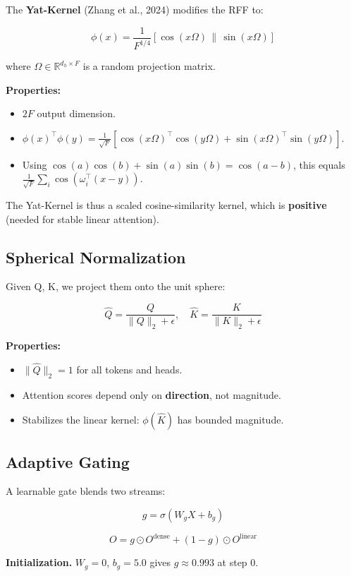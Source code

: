 The \textbf{Yat-Kernel} (Zhang et al., 2024) modifies the RFF to:

\[
\phi(x) = \frac{1}{F^{1/4}} [\cos(x \Omega) \,\|\, \sin(x \Omega)]
\]

where $\Omega \in \mathbb{R}^{d_h \times F}$ is a random projection matrix.

\textbf{Properties:}

\begin{itemize}
\item $2F$ output dimension.
\item $\phi(x)^\top \phi(y) = \frac{1}{\sqrt{F}} [\cos(x\Omega)^\top \cos(y\Omega) + \sin(x\Omega)^\top \sin(y\Omega)]$.
\item Using $\cos(a)\cos(b) + \sin(a)\sin(b) = \cos(a - b)$, this equals
  $\frac{1}{\sqrt{F}} \sum_i \cos(\omega_i^\top (x - y))$.

\end{itemize}
The Yat-Kernel is thus a scaled cosine-similarity kernel, which is 
\textbf{positive} (needed for stable linear attention).

\subsection{Spherical Normalization}

Given Q, K, we project them onto the unit sphere:

\[
\hat{Q} = \frac{Q}{\|Q\|_2 + \epsilon}, \quad
\hat{K} = \frac{K}{\|K\|_2 + \epsilon}
\]

\textbf{Properties:}

\begin{itemize}
\item $\|\hat{Q}\|_2 = 1$ for all tokens and heads.
\item Attention scores depend only on \textbf{direction}, not magnitude.
\item Stabilizes the linear kernel: $\phi(\hat{K})$ has bounded magnitude.

\end{itemize}
\subsection{Adaptive Gating}

A learnable gate blends two streams:

\[
g = \sigma(W_g X + b_g)
\]

\[
O = g \odot O^\text{dense} + (1 - g) \odot O^\text{linear}
\]

\textbf{Initialization.} $W_g = 0$, $b_g = 5.0$ gives $g \approx 
0.993$ at step 0.

